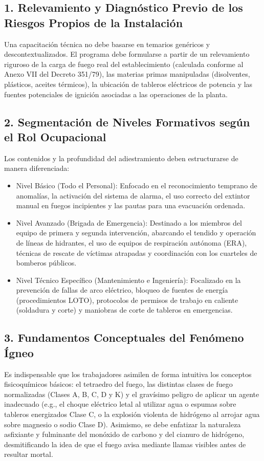 \subsection{1. Relevamiento y Diagnóstico Previo de los Riesgos Propios de la Instalación}
Una capacitación técnica no debe basarse en temarios genéricos y descontextualizados. El programa debe formularse a
partir de un relevamiento riguroso de la carga de fuego real del establecimiento (calculada conforme al Anexo VII del
Decreto 351/79), las materias primas manipuladas (disolventes, plásticos, aceites térmicos), la ubicación de tableros
eléctricos de potencia y las fuentes potenciales de ignición asociadas a las operaciones de la planta.

\subsection{2. Segmentación de Niveles Formativos según el Rol Ocupacional}
Los contenidos y la profundidad del adiestramiento deben estructurarse de manera diferenciada:
\begin{itemize}
    \item Nivel Básico (Todo el Personal): Enfocado en el reconocimiento temprano de anomalías, la activación del sistema
          de alarma, el uso correcto del extintor manual en fuegos incipientes y las pautas para una evacuación ordenada.
    \item Nivel Avanzado (Brigada de Emergencia): Destinado a los miembros del equipo de primera y segunda intervención,
          abarcando el tendido y operación de líneas de hidrantes, el uso de equipos de respiración autónoma (ERA), técnicas
          de rescate de víctimas atrapadas y coordinación con los cuarteles de bomberos públicos.
    \item Nivel Técnico Específico (Mantenimiento e Ingeniería): Focalizado en la prevención de fallas de arco eléctrico,
          bloqueo de fuentes de energía (procedimientos LOTO), protocolos de permisos de trabajo en caliente (soldadura y
          corte) y maniobras de corte de tableros en emergencias.
\end{itemize}

\subsection{3. Fundamentos Conceptuales del Fenómeno Ígneo}
Es indispensable que los trabajadores asimilen de forma intuitiva los conceptos fisicoquímicos básicos: el tetraedro del
fuego, las distintas clases de fuego normalizadas (Clases A, B, C, D y K) y el gravísimo peligro de aplicar un agente
inadecuado (e.g., el choque eléctrico letal al utilizar agua o espumas sobre tableros energizados Clase C, o la explosión
violenta de hidrógeno al arrojar agua sobre magnesio o sodio Clase D). Asimismo, se debe enfatizar la naturaleza
asfixiante y fulminante del monóxido de carbono y del cianuro de hidrógeno, desmitificando la idea de que el fuego avisa
mediante llamas visibles antes de resultar mortal.

